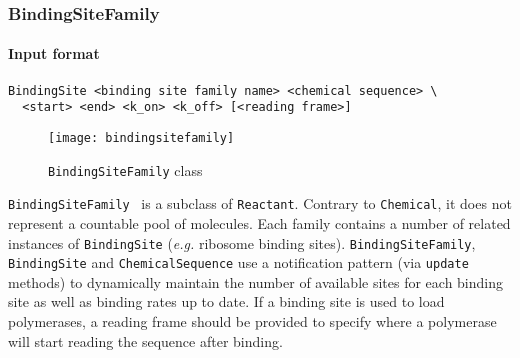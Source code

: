 \subsubsection{BindingSiteFamily}

\paragraph{Input format}
\begin{verbatim}
BindingSite <binding site family name> <chemical sequence> \
  <start> <end> <k_on> <k_off> [<reading frame>]
\end{verbatim}

\begin{figure}[!h]
  \centering
  \texttt{[image: bindingsitefamily]}
  \caption{\texttt{BindingSiteFamily} class}
\label{fig:bsf}
\end{figure}

\texttt{BindingSiteFamily}~ is a subclass of \texttt{Reactant}.
Contrary to \texttt{Chemical}, it does not represent a countable pool of molecules.
Each family contains a number of related instances of \texttt{BindingSite}
(\textit{e.g.} ribosome binding sites).
\texttt{BindingSiteFamily}, \texttt{BindingSite} and \texttt{ChemicalSequence}
use a notification pattern (via \texttt{update} methods) to dynamically maintain
the number of available sites for each binding site as well as binding rates up to date.
If a binding site is used to load polymerases, a reading frame should be provided
to specify where a polymerase will start reading the sequence after binding.
